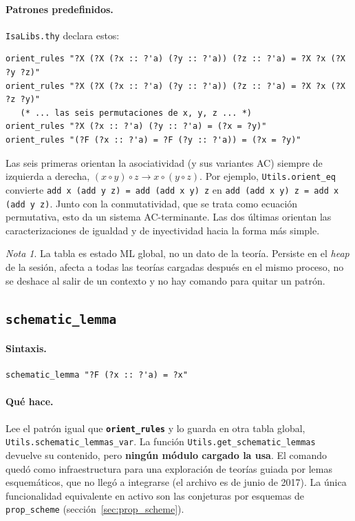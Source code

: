\documentclass[11pt,a4paper]{article}
\newcommand{\isa}[1]{\texttt{#1}}
\newcommand{\cmd}[1]{\textbf{\texttt{#1}}}
\newcommand{\rw}{\rightarrow}
\theoremstyle{definition}
\theoremstyle{remark}
\newtheorem*{nota}{Nota}
\begin{document}
\paragraph{Patrones predefinidos.} \isa{IsaLibs.thy} declara estos:
\begin{lstlisting}
orient_rules "?X (?X (?x :: ?'a) (?y :: ?'a)) (?z :: ?'a) = ?X ?x (?X ?y ?z)"
orient_rules "?X (?X (?x :: ?'a) (?y :: ?'a)) (?z :: ?'a) = ?X ?x (?X ?z ?y)"
   (* ... las seis permutaciones de x, y, z ... *)
orient_rules "?X (?x :: ?'a) (?y :: ?'a) = (?x = ?y)"
orient_rules "(?F (?x :: ?'a) = ?F (?y :: ?'a)) = (?x = ?y)"
\end{lstlisting}
Las seis primeras orientan la asociatividad (y sus variantes AC) siempre de
izquierda a derecha, $(x \circ y) \circ z \rw x \circ (y \circ z)$. Por ejemplo,
\isa{Utils.orient\_eq} convierte
\isa{add x (add y z) = add (add x y) z} en
\isa{add (add x y) z = add x (add y z)}. Junto con la
conmutatividad, que se trata como ecuación permutativa, esto da un sistema
AC-terminante. Las dos últimas orientan las caracterizaciones de igualdad y de
inyectividad hacia la forma más simple.

\begin{nota}
La tabla es estado ML global, no un dato de la teoría. Persiste en el \emph{heap} de
la sesión, afecta a todas las teorías cargadas después en el mismo proceso, no se
deshace al salir de un contexto y no hay comando para quitar un patrón.
\end{nota}

\subsection{\texttt{schematic\_lemma}}
\label{sec:schematic}

\paragraph{Sintaxis.}
\begin{lstlisting}
schematic_lemma "?F (?x :: ?'a) = ?x"
\end{lstlisting}

\paragraph{Qué hace.}
Lee el patrón igual que \cmd{orient\_rules} y lo guarda en otra tabla global,
\isa{Utils.schematic\_lemmas\_var}. La función \isa{Utils.get\_schematic\_lemmas}
devuelve su contenido, pero \textbf{ningún módulo cargado la usa}. El comando quedó
como infraestructura para una exploración de teorías guiada por lemas esquemáticos,
que no llegó a integrarse (el archivo es de junio de 2017). La única funcionalidad
equivalente en activo son las conjeturas por esquemas de \isa{prop\_scheme}
(sección~\ref{sec:prop_scheme}).
\end{document}

